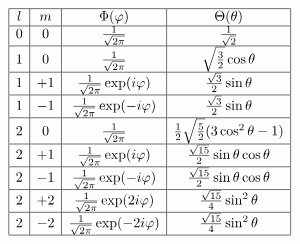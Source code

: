 \documentclass[UTF8,9pt]{ctexart}
\begin{document}
$$
\begin{array}{|c|c|c|c|c|c|}
\hline
l & m  & {  \Phi (\varphi )}                             & {  \Theta (\theta )}                                          \\ \hline
0 & 0  & {  {\frac {1}{\sqrt {2\pi }}}}                  & {  {\frac {1}{\sqrt {2}}}}                                    \\ \hline
1 & 0  & {  {\frac {1}{\sqrt {2\pi }}}}                  & {  {\sqrt {\frac {3}{2}}}\cos \theta }                        \\ \hline
1 & +1 & {  {\frac {1}{\sqrt {2\pi }}}\exp(i\varphi )}   & {  {\frac {\sqrt {3}}{2}}\sin \theta }                        \\ \hline
1 & -1 & {  {\frac {1}{\sqrt {2\pi }}}\exp(-i\varphi )}  & {  {\frac {\sqrt {3}}{2}}\sin \theta }                        \\ \hline
2 & 0  & {  {\frac {1}{\sqrt {2\pi }}}}                  & {  {\frac {1}{2}}{\sqrt {\frac {5}{2}}}(3\cos ^{2}\theta -1)} \\ \hline
2 & +1 & {  {\frac {1}{\sqrt {2\pi }}}\exp(i\varphi )}   & {  {\frac {\sqrt {15}}{2}}\sin \theta \cos \theta }           \\ \hline
2 & -1 & {  {\frac {1}{\sqrt {2\pi }}}\exp(-i\varphi )}  & {  {\frac {\sqrt {15}}{2}}\sin \theta \cos \theta }           \\ \hline
2 & +2 & {  {\frac {1}{\sqrt {2\pi }}}\exp(2i\varphi )}  & {  {\frac {\sqrt {15}}{4}}\sin ^{2}\theta }                   \\ \hline
2 & -2 & {  {\frac {1}{\sqrt {2\pi }}}\exp(-2i\varphi )} & {  {\frac {\sqrt {15}}{4}}\sin ^{2}\theta }                   \\ \hline
\end{array}$$
\end{document}

